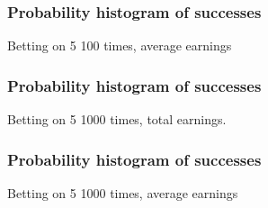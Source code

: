 \documentclass[handout]{beamer}
\begin{document}
   \begin{frame}
   \frametitle{Probability histogram of successes}
   \begin{center}
   \end{center}
   Betting on {\color{red} 5} 100 times, average earnings
   \end{frame}



   \begin{frame}
   \frametitle{Probability histogram of successes}
   \begin{center}
   \end{center}
   Betting on {\color{red} 5} 1000 times,  total earnings.
   \end{frame}



   \begin{frame}
   \frametitle{Probability histogram of successes}
   \begin{center}
   \end{center}
   Betting on {\color{red} 5} 1000 times, average earnings
   \end{frame}
\end{document}
